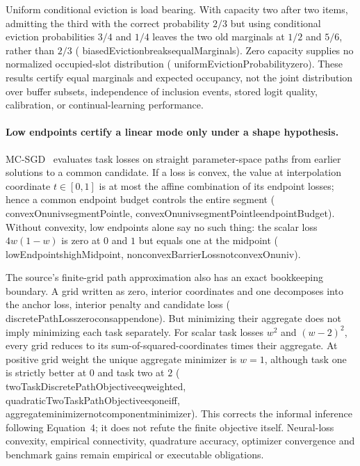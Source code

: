 \documentclass[11pt]{article}
\newcommand{\leanname}[1]{{\scriptsize\ttfamily
  \def\_{\textunderscore\allowbreak}#1}}
\begin{document}
Uniform conditional eviction is load bearing.  With capacity two after two
items, admitting the third with the correct probability $2/3$ but using
conditional eviction probabilities $3/4$ and $1/4$ leaves the two old
marginals at $1/2$ and $5/6$, rather than $2/3$
(\leanname{biasedEviction\_breaks\_equalMarginals}).
Zero capacity supplies no normalized occupied-slot distribution
(\leanname{uniformEvictionProbability\_zero}).
These results certify equal marginals and expected occupancy, not the joint
distribution over buffer subsets, independence of inclusion events, stored
logit quality, calibration, or continual-learning performance.

\paragraph{Low endpoints certify a linear mode only under a shape hypothesis.}
MC-SGD~\cite{mirzadeh2021mode} evaluates task losses on straight
parameter-space paths from earlier solutions to a common candidate.  If a loss
is convex, the value at interpolation coordinate $t\in[0,1]$ is at most the
affine combination of its endpoint losses; hence a common endpoint budget
controls the entire segment
(\leanname{convexOn\_univ\_segmentPoint\_le},
\leanname{convexOn\_univ\_segmentPoint\_le\_endpointBudget}).
Without convexity, low endpoints alone say no such thing: the scalar loss
$4w(1-w)$ is zero at $0$ and $1$ but equals one at the midpoint
(\leanname{lowEndpoints\_highMidpoint},
\leanname{nonconvexBarrierLoss\_not\_convexOn\_univ}).

The source's finite-grid path approximation also has an exact bookkeeping
boundary.  A grid written as zero, interior coordinates and one decomposes
into the anchor loss, interior penalty and candidate loss
(\leanname{discretePathLoss\_zero\_cons\_append\_one}).
But minimizing their aggregate does not imply minimizing each task separately.
For scalar task losses $w^2$ and $(w-2)^2$, every grid reduces to its
sum-of-squared-coordinates times their aggregate.  At positive grid weight the
unique aggregate minimizer is $w=1$, although task one is strictly better at
$0$ and task two at $2$
(\leanname{twoTaskDiscretePathObjective\_eq\_weighted},
\leanname{quadraticTwoTaskPathObjective\_eq\_one\_iff},
\leanname{aggregate\_minimizer\_not\_component\_minimizer}).
This corrects the informal inference following Equation~4; it does not refute
the finite objective itself.  Neural-loss convexity, empirical connectivity,
quadrature accuracy, optimizer convergence and benchmark gains remain
empirical or executable obligations.
\end{document}
